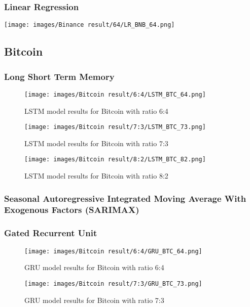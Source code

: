 \documentclass{ieeeojies}
\begin{document}
\subsubsection{Linear Regression}
\texttt{[image: images/Binance result/64/LR\_BNB\_64.png]}\\
\subsection{Bitcoin}
\subsubsection{Long Short Term Memory}

\begin{figure}[H]
  \centering
  \texttt{[image: images/Bitcoin result/6:4/LSTM\_BTC\_64.png]}
  \caption{LSTM model results for Bitcoin with ratio 6:4}
  \label{fig:lstm_btc_64}
\end{figure}

\begin{figure}[H]
  \centering
  \texttt{[image: images/Bitcoin result/7:3/LSTM\_BTC\_73.png]}
  \caption{LSTM model results for Bitcoin with ratio 7:3}
  \label{fig:lstm_btc_73}
\end{figure}

\begin{figure}[H]
  \centering
  \texttt{[image: images/Bitcoin result/8:2/LSTM\_BTC\_82.png]}
  \caption{LSTM model results for Bitcoin with ratio 8:2}
  \label{fig:lstm_btc_82}
\end{figure}
\subsubsection{Seasonal Autoregressive Integrated
Moving Average With Exogenous Factors
(SARIMAX)}
\subsubsection{Gated Recurrent Unit}

\begin{figure}[H]
  \centering
  \texttt{[image: images/Bitcoin result/6:4/GRU\_BTC\_64.png]}
  \caption{GRU model results for Bitcoin with ratio 6:4}
  \label{fig:gru_btc_64}
\end{figure}

\begin{figure}[H]
  \centering
  \texttt{[image: images/Bitcoin result/7:3/GRU\_BTC\_73.png]}
  \caption{GRU model results for Bitcoin with ratio 7:3}
  \label{fig:gru_btc_73}
\end{figure}
\end{document}
